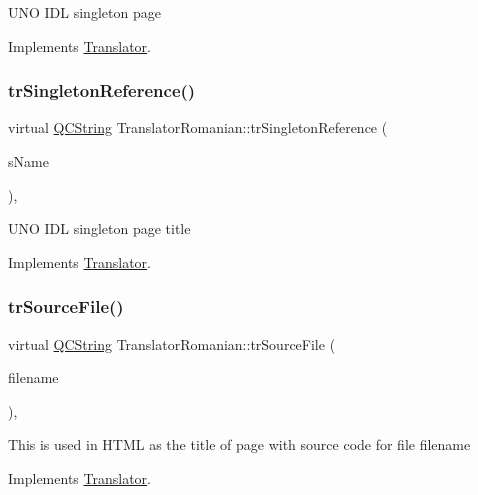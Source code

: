 U\+NO I\+DL singleton page 

Implements \mbox{\hyperlink{class_translator}{Translator}}.

\mbox{\label{class_translator_romanian_a82f669d89fcc56213572af6e654f56d6}} 
\subsubsection{\texorpdfstring{trSingletonReference()}{trSingletonReference()}}
{\footnotesize\ttfamily virtual \mbox{\hyperlink{class_q_c_string}{Q\+C\+String}} Translator\+Romanian\+::tr\+Singleton\+Reference (\begin{DoxyParamCaption}\item[{const char $\ast$}]{s\+Name }\end{DoxyParamCaption})\hspace{0.3cm}{\ttfamily [inline]}, {\ttfamily [virtual]}}

U\+NO I\+DL singleton page title 

Implements \mbox{\hyperlink{class_translator}{Translator}}.

\mbox{\label{class_translator_romanian_a7dcfb3e4b4777674a86c6365aaecc2b5}} 
\subsubsection{\texorpdfstring{trSourceFile()}{trSourceFile()}}
{\footnotesize\ttfamily virtual \mbox{\hyperlink{class_q_c_string}{Q\+C\+String}} Translator\+Romanian\+::tr\+Source\+File (\begin{DoxyParamCaption}\item[{\mbox{\hyperlink{class_q_c_string}{Q\+C\+String}} \&}]{filename }\end{DoxyParamCaption})\hspace{0.3cm}{\ttfamily [inline]}, {\ttfamily [virtual]}}

This is used in H\+T\+ML as the title of page with source code for file filename 

Implements \mbox{\hyperlink{class_translator}{Translator}}.

